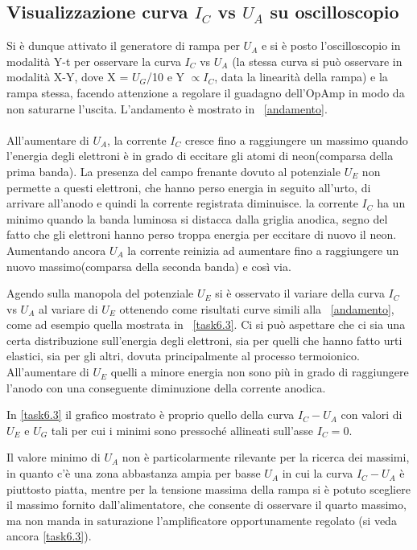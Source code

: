 \documentclass[10pt,a4paper]{article}
\begin{document}
\subsection{Visualizzazione curva $I_{C}$ vs $U_{A}$ su oscilloscopio}
Si è dunque attivato il generatore di rampa per $U_{A}$ e si è posto l'oscilloscopio in modalità Y-t per osservare la curva $I_{C}$ vs $U_{A}$ (la stessa curva si può osservare in modalità X-Y, dove X = $U_{G}$/10 e Y $\propto I_{C}$, data la linearità della rampa) e la rampa stessa, facendo attenzione a regolare il guadagno dell'OpAmp in modo da non saturarne l'uscita. L'andamento è mostrato in \figurename{~\ref{andamento}}.

\paragraph{} All'aumentare di $U_{A}$, la corrente $I_{C}$ cresce fino a raggiungere un massimo quando l'energia degli elettroni è in grado di eccitare gli atomi di neon(comparsa della prima banda). La presenza del campo frenante dovuto al potenziale $U_{E}$ non permette a questi elettroni, che hanno perso energia in seguito all'urto, di arrivare all'anodo e quindi la corrente registrata diminuisce. la corrente $I_{C}$ ha un minimo quando la banda luminosa si distacca dalla griglia anodica, segno del fatto che gli elettroni hanno perso troppa energia per eccitare di nuovo il neon.
Aumentando ancora $U_{A}$ la corrente reinizia ad aumentare fino a raggiungere un nuovo massimo(comparsa della seconda banda) e così via.

Agendo sulla manopola del potenziale $U_{E}$ si è osservato il variare della curva $I_{C}$ vs $U_{A}$ al variare di $U_{E}$ ottenendo come risultati curve simili alla \figurename{~\ref{andamento}}, come ad esempio quella mostrata in \figurename{~\ref{task6.3}}.
Ci si può aspettare che ci sia una certa distribuzione sull'energia degli elettroni, sia per quelli che hanno fatto urti elastici, sia per gli altri, dovuta principalmente al processo termoionico. All'aumentare di $U_E$ quelli a minore energia non sono più in grado di raggiungere l'anodo con una conseguente diminuzione della corrente anodica.

In \figurename{\ref{task6.3}} il grafico mostrato è proprio quello della curva $I_{C} - U_{A}$ con valori di $U_E$ e $U_G$ tali per cui i minimi sono pressoché allineati sull'asse $I_C = 0$.

Il valore minimo di $U_A$ non è particolarmente rilevante per la ricerca dei massimi, in quanto c'è una zona abbastanza ampia per basse $U_A$ in cui la curva $I_{C} - U_{A}$ è piuttosto piatta, mentre per la tensione massima della rampa si è potuto scegliere il massimo fornito dall'alimentatore, che consente di osservare il quarto massimo, ma non manda in saturazione l'amplificatore opportunamente regolato (si veda ancora \figurename{\ref{task6.3}}).
\end{document}
